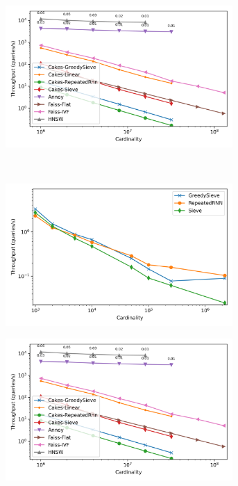 \begin{figure}
\begin{subfigure}[b]{0.47\textwidth}
\label{fig:results:sift-scaling}
\end{subfigure}%
\begin{subfigure}[b]{0.47\textwidth}
\includegraphics[width=0.95\textwidth]{plots/random-knn-10.png}
\label{fig:results:random-scaling}
\end{subfigure}%
\vspace{1em}
\\
\begin{subfigure}[b]{0.47\textwidth}
\includegraphics[width=0.95\textwidth]{plots/silva-knn-10.png}
\label{fig:results:silva-scaling}
\end{subfigure}%
\begin{subfigure}[b]{0.47\textwidth}
\includegraphics[width=0.95\textwidth]{plots/radio-ml-knn-10.png}

\end{subfigure}
\end{figure}
